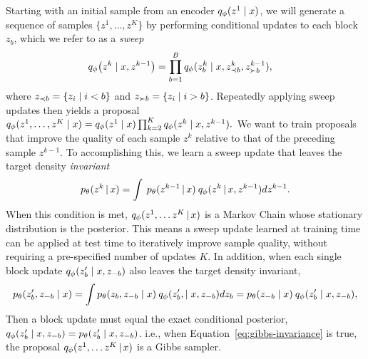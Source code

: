 \documentclass[anonymous=false, %
               format=acmsmall, %
               review=true, %
               screen=true, %
               nonacm=true]{acmart}
\theoremstyle{definition}
\begin{document}
Starting with an initial sample from an encoder $q_\phi(z^{1} \mid x)$, we will generate a sequence of samples $\{z^1, \ldots, z^K\}$ by performing conditional updates to each block $z_b$, which we refer to as a \emph{sweep}
\begin{align}
    \label{eq:approx-gibbs-kernel}
    q_\phi \big( z^k \mid x, z^{k-1} \big)
    &=
    \prod_{b=1}^B
    q_\phi(z^k_b \mid x, z^{k}_{\prec b}, z^{k-1}_{\succ b})
    ,
\end{align}
where $z_{\prec b} = \{z_i \mid i < b\}$ and $z_{\succ b} = \{z_i \mid i > b\}$. Repeatedly applying sweep updates then yields a proposal
$
    q_\phi(z^1, \ldots, z^K \mid x) 
    =
    q_\phi(z^1 \mid x)
    \prod_{k=2}^K
    q_\phi(z^k \mid x, z^{k-1}).
$
We want to train proposals that improve the quality of each sample $z^k$ relative to that of the preceding sample $z^{k-1}$. To accomplishing this, we learn a sweep update that leaves the target density \emph{invariant}
\begin{equation}
    \label{eq:kernel-invariance}
    p_\theta(z^k \,|\, x) = \int \: p_\theta(z^{k-1} \,|\, x) \: q_\phi(z^k \,|\,x, z^{k-1}) d z^{k-1}.
\end{equation}
When this condition is met, $q_\phi(z^1, \ldots z^K \,|\, x)$ is a Markov Chain whose stationary distribution is the posterior. 
This means a sweep update learned at training time can be applied at test time to iteratively improve sample quality, without requiring a pre-specified number of updates $K$. In addition, when each single block update $q_\phi(z'_b \mid x, z_{-b})$ also leaves the target density invariant,
\begin{align}
    \label{eq:gibbs-invariance}
    p_\theta(z'_b, z_{-b} \mid x)
    = 
    \int 
    p_\theta(z_b, z_{-b} \mid x) \:
    q_\phi(z'_b, \mid x, z_{-b}) 
    dz_{b}
    = 
    p_\theta(z_{-b} \mid x) \:
    q_\phi(z'_b \mid x, z_{-b})
    ,
\end{align}
Then a block update must equal the exact conditional posterior, $q_\phi(z'_b \mid x, z_{-b}) = p_\theta(z'_b \mid x, z_{-b})$.
i.e., when Equation~\ref{eq:gibbs-invariance} is true, the proposal $q_\phi(z^1, \ldots z^K \,|\, x)$ is a Gibbs sampler.
\end{document}
